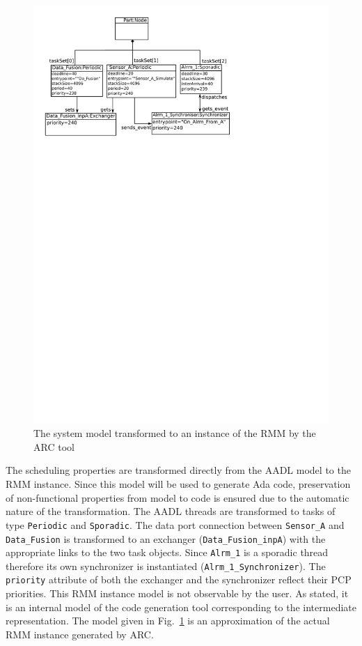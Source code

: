 \begin{figure}
\centering
\includegraphics[scale=0.70]{figs/rmm_inst}
\caption{The system model transformed to an instance of the RMM by the ARC tool}
\label{fig:rmm_inst}
\end{figure}

The scheduling properties are transformed directly from the AADL model
to the RMM instance. Since this model will be used to generate Ada
code, preservation of non-functional properties from model to code is
ensured due to the automatic nature of the transformation. The AADL
threads are transformed to tasks of type \texttt{Periodic} and
\texttt{Sporadic}. The data port connection between \texttt{Sensor\_A}
and \texttt{Data\_Fusion} is transformed to an exchanger
(\texttt{Data\_Fusion\_inpA}) with the appropriate links to the two
task objects. Since \texttt{Alrm\_1} is a sporadic thread therefore
its own synchronizer is instantiated
(\texttt{Alrm\_1\_Synchronizer}). The \texttt{priority} attribute of
both the exchanger and the synchronizer reflect their PCP
priorities. This RMM instance model is not observable by the user. As
stated, it is an internal model of the code generation tool
corresponding to the intermediate representation. The model given in
Fig.~\ref{fig:rmm_inst} is an approximation of the actual RMM instance
generated by ARC.

